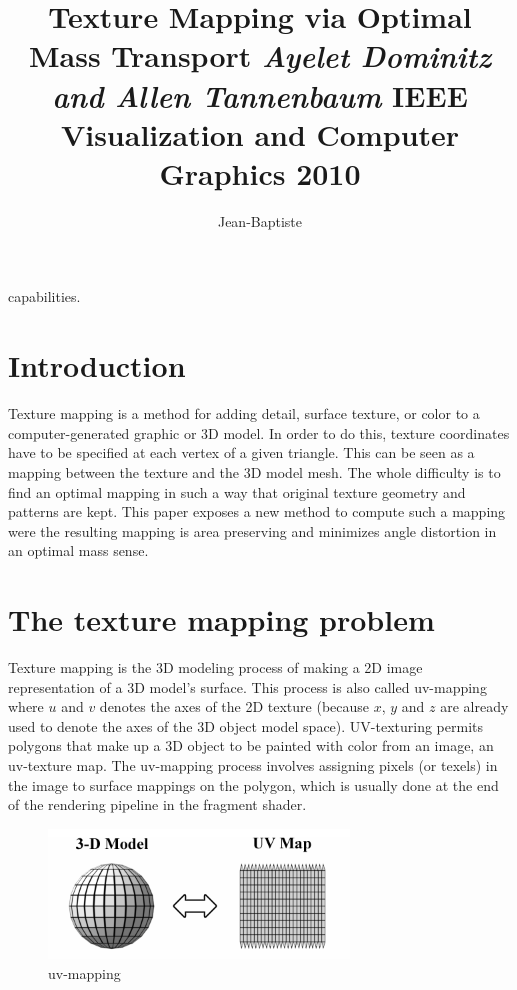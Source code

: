 capabilities.\documentclass[11pt,a4paper]{article}
\title{
      \bsc{Paper Review}
      \vskip 1cm
      {\colorb\textbf{Texture Mapping via Optimal Mass Transport}}
      \vskip 1cm
      {\colorc\textit{Ayelet Dominitz and Allen Tannenbaum}}
      \vskip 1cm
      {IEEE Visualization and Computer Graphics 2010}
  }
\author{%
    Jean-Baptiste \bsc{Keck}
    \vskip 0.5cm
    \bsc{M2 Msiam}
}
\makeatletter
\newcommand{\colora}{\color{Cerulean}}
\def\maketitle{%
    \begin{flushleft}
        \normalfont\LARGE\par
    \end{flushleft}
    \vskip 2cm
    \begin{center}%
        {\colora\specialrule{.2em}{0em}{0em}}
        \vskip 1cm
        {\Huge \@title}%
        \vskip 1cm
        {\colora\specialrule{.2em}{0em}{0em}}
        \vskip 4cm
        {\Huge \@author\par}%
        \vskip 2cm
        {\Huge \@date\par}%
        \vskip 1cm

    \end{center}%
    \clearpage
}
\makeatother
\begin{document}
\pagestyle{fancy}

\maketitle


\section{Introduction}

Texture mapping is a method for adding detail, surface texture, or color to a computer-generated graphic or 3D model. 
In order to do this, texture coordinates have to be specified at each vertex of a given triangle. This can be seen as a mapping between the texture and the 3D model mesh. The whole difficulty is to find an optimal mapping in such a way that original texture geometry and patterns are kept.
This paper exposes a new method to compute such a mapping were the resulting mapping is area preserving and minimizes angle distortion in an optimal mass sense.

\section{The texture mapping problem}

Texture mapping is the 3D modeling process of making a 2D image representation of a 3D model's surface.
This process is also called uv-mapping where $u$ and $v$ denotes the axes of the 2D texture (because $x$, $y$ and $z$ are already used to denote the axes of the 3D object model space).
UV-texturing permits polygons that make up a 3D object to be painted with color from an image, an uv-texture map.
The uv-mapping process involves assigning pixels (or texels) in the image to surface mappings on the polygon, which is usually done at the end of the rendering pipeline in the fragment shader.

\vskip 0.3cm
\begin{figure}[H]
   \centering
   \includegraphics[width=8cm]{1.png}
   \caption{uv-mapping}
\end{figure}
\vskip 0.3cm
\end{document}

